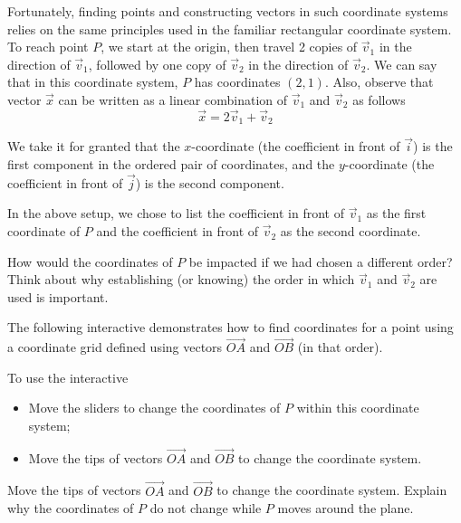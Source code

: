 \documentclass{ximera}
\begin{document}
 Fortunately, finding points and constructing vectors in such coordinate systems relies on the same principles used in the familiar rectangular coordinate system. To reach point $P$, we start at the origin, then travel 2 copies of $\vec{v}_1$ in the direction of $\vec{v}_1$, followed by one copy of $\vec{v}_2$ in the direction of $\vec{v}_2$.  We can say that in this coordinate system, $P$ has coordinates $(2,1)$.  Also, observe that vector $\vec{x}$ can be written as a linear combination of $\vec{v}_1$ and $\vec{v}_2$ as follows $$\vec{x}=2\vec{v}_1+\vec{v}_2$$
 
 \begin{idea}
    We take it for granted that the $x$-coordinate (the coefficient in front of $\vec{i}$) is the first component in the ordered pair of coordinates, and the $y$-coordinate (the coefficient in front of $\vec{j}$) is the second component.  

    In the above setup, we chose to list the coefficient in front of $\vec{v}_1$ as the first coordinate of $P$ and the coefficient in front of $\vec{v}_2$ as the second coordinate.  

    How would the coordinates of $P$ be impacted if we had chosen a different order?  Think about why establishing (or knowing) the order in which $\vec{v}_1$ and $\vec{v}_2$ are used is important.
 \end{idea}

 \begin{exploration}\label{exp:readingCoords}

 The following interactive demonstrates how to find coordinates for a point using a coordinate grid defined using vectors $\overrightarrow{OA}$ and $\overrightarrow{OB}$ (in that order).
 
 To use the interactive
 \begin{itemize}
    \item Move the sliders to change the coordinates of $P$ within this coordinate system;
    \item Move the tips of vectors $\overrightarrow{OA}$ and $\overrightarrow{OB}$ to change the coordinate system.  
 \end{itemize}    
    
 \begin{question}
    Move the tips of vectors $\overrightarrow{OA}$ and $\overrightarrow{OB}$ to change the coordinate system.  Explain why the coordinates of $P$ do not change while $P$ moves around the plane.
 \end{question}    


\begin{center}
\end{center}

\end{exploration}
\end{document}
